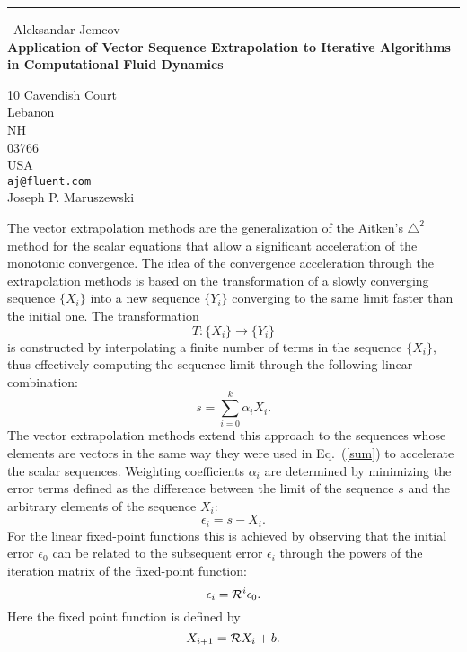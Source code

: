 \documentclass{report}
\begin{document}
\begin{center}
\rule{6in}{1pt} \
{\large Aleksandar Jemcov \\
{\bf Application of Vector Sequence Extrapolation to Iterative Algorithms in Computational Fluid Dynamics}}

10 Cavendish Court \\ Lebanon \\ NH \\ 03766 \\ USA
\\
{\tt aj@fluent.com}\\
Joseph P. Maruszewski\end{center}

The vector extrapolation methods are the generalization of the
Aitken's $\triangle^2$ method for the scalar equations that allow
a significant acceleration of the monotonic convergence. The idea
of the convergence acceleration through the extrapolation methods
is based on the transformation of a slowly converging sequence
$\{X_i\}$ into a new sequence $\{Y_i\}$ converging to the same
limit faster than the initial one. The transformation
\begin{equation}
T: \{X_i\} \rightarrow \{Y_i\}
\end{equation}
is constructed by interpolating a finite number of terms in the
sequence $\{X_i\}$, thus effectively computing the sequence limit
through the following linear combination:
\begin{equation}\label{sum}
s = \sum_{i=0}^{k} \alpha_i X_i.
\end{equation}
The vector extrapolation methods extend this approach to the
sequences whose elements are vectors in the same way they were
used in Eq.~(\ref{sum}) to accelerate the scalar sequences.
Weighting coefficients $\alpha_i$ are determined by minimizing
the error terms defined as the difference between the limit of
the sequence $s$ and the arbitrary elements of the sequence
$X_i$:
\begin{equation}\label{error}
\epsilon_i = s - X_i.
\end{equation}
For the linear fixed-point functions this is achieved by
observing that the initial error $\epsilon_0$ can be related to
the subsequent error $\epsilon_i$ through the powers of the
iteration matrix of the fixed-point function:
\begin{equation}\label{recursion}
\epsilon_i = {\cal R}^i \epsilon_0.
\end{equation}
Here the fixed point function is defined by
\begin{equation}\label{fp}
X_{i+1} = {\cal R}X_i + b.
\end{equation}
\end{document}
